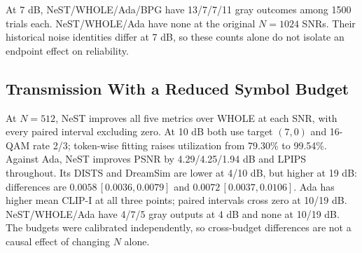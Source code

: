 At 7 dB, NeST/WHOLE/Ada/BPG have 13/7/7/11 gray outcomes among 1500 trials each. NeST/WHOLE/Ada have none at the original $N=1024$ SNRs. Their historical noise identities differ at 7 dB, so these counts alone do not isolate an endpoint effect on reliability.

\subsection{Transmission With a Reduced Symbol Budget}

At $N=512$, NeST improves all five metrics over WHOLE at each SNR, with every paired interval excluding zero. At 10 dB both use target $(7,0)$ and 16-QAM rate 2/3; token-wise fitting raises utilization from 79.30\% to 99.54\%. Against Ada, NeST improves PSNR by 4.29/4.25/1.94 dB and LPIPS throughout. Its DISTS and DreamSim are lower at 4/10 dB, but higher at 19 dB: differences are $0.0058\,[0.0036,0.0079]$ and $0.0072\,[0.0037,0.0106]$. Ada has higher mean CLIP-I at all three points; paired intervals cross zero at 10/19 dB. NeST/WHOLE/Ada have 4/7/5 gray outputs at 4 dB and none at 10/19 dB. The budgets were calibrated independently, so cross-budget differences are not a causal effect of changing $N$ alone.


